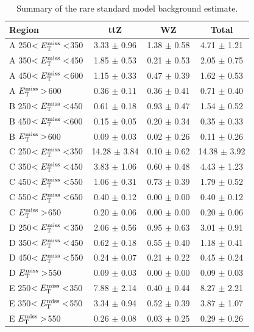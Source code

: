 \begin{table}[htb]
\centering
\caption{Summary of the rare standard model background
  estimate.}
\label{tab:stop:rarebkg:results}
\begin{tabular}{|l|cc|c|}
\hline
Region & ttZ & WZ & Total  \\
\hline
 A 250$<E_\text{T}^\text{miss}<$350 & 3.33 $\pm$ 0.96   & 1.38 $\pm$ 0.58   & 4.71 $\pm$ 1.21   \\
 A 350$<E_\text{T}^\text{miss}<$450 & 1.85 $\pm$ 0.53   & 0.21 $\pm$ 0.53   & 2.05 $\pm$ 0.75   \\
 A 450$<E_\text{T}^\text{miss}<$600 & 1.15 $\pm$ 0.33   & 0.47 $\pm$ 0.39   & 1.62 $\pm$ 0.53   \\
 A $E_\text{T}^\text{miss}>$600 & 0.36 $\pm$ 0.11   & 0.36 $\pm$ 0.41   & 0.71 $\pm$ 0.40   \\
 B 250$<E_\text{T}^\text{miss}<$450 & 0.61 $\pm$ 0.18   & 0.93 $\pm$ 0.47   & 1.54 $\pm$ 0.52   \\
 B 450$<E_\text{T}^\text{miss}<$600 & 0.15 $\pm$ 0.05   & 0.20 $\pm$ 0.34   & 0.35 $\pm$ 0.33   \\
 B $E_\text{T}^\text{miss}>$600 & 0.09 $\pm$ 0.03   & 0.02 $\pm$ 0.26   & 0.11 $\pm$ 0.26   \\
 C 250$<E_\text{T}^\text{miss}<$350 & 14.28 $\pm$ 3.84  & 0.10 $\pm$ 0.62   & 14.38 $\pm$ 3.92  \\
 C 350$<E_\text{T}^\text{miss}<$450 & 3.83 $\pm$ 1.06   & 0.60 $\pm$ 0.48   & 4.43 $\pm$ 1.23   \\
 C 450$<E_\text{T}^\text{miss}<$550 & 1.06 $\pm$ 0.31   & 0.73 $\pm$ 0.39   & 1.79 $\pm$ 0.52   \\
 C 550$<E_\text{T}^\text{miss}<$650 & 0.40 $\pm$ 0.12   & 0.00 $\pm$ 0.00   & 0.40 $\pm$ 0.12   \\
 C $E_\text{T}^\text{miss}>$650 & 0.20 $\pm$ 0.06   & 0.00 $\pm$ 0.00   & 0.20 $\pm$ 0.06   \\
 D 250$<E_\text{T}^\text{miss}<$350 & 2.06 $\pm$ 0.56   & 0.95 $\pm$ 0.63   & 3.01 $\pm$ 0.91   \\
 D 350$<E_\text{T}^\text{miss}<$450 & 0.62 $\pm$ 0.18   & 0.55 $\pm$ 0.40   & 1.18 $\pm$ 0.41   \\
 D 450$<E_\text{T}^\text{miss}<$550 & 0.24 $\pm$ 0.07   & 0.21 $\pm$ 0.22   & 0.45 $\pm$ 0.24   \\
 D $E_\text{T}^\text{miss}>$550 & 0.09 $\pm$ 0.03   & 0.00 $\pm$ 0.00   & 0.09 $\pm$ 0.03   \\
 E 250$<E_\text{T}^\text{miss}<$350 & 7.88 $\pm$ 2.14   & 0.40 $\pm$ 0.44   & 8.27 $\pm$ 2.21   \\
 E 350$<E_\text{T}^\text{miss}<$550 & 3.34 $\pm$ 0.94   & 0.52 $\pm$ 0.39   & 3.87 $\pm$ 1.07   \\
 E $E_\text{T}^\text{miss}>$550 & 0.26 $\pm$ 0.08   & 0.03 $\pm$ 0.25   & 0.29 $\pm$ 0.26   \\

\end{tabular}
\end{table}
